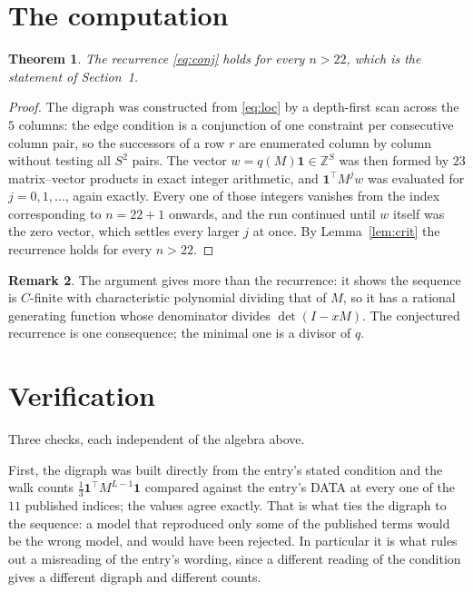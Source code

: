 \documentclass[11pt,a4paper]{article}
\theoremstyle{plain}
\newtheorem{theorem}{Theorem}
\theoremstyle{definition}
\newtheorem{remark}[theorem]{Remark}
\begin{document}
\section{The computation}

\begin{theorem}
The recurrence \eqref{eq:conj} holds for every $n>22$, which is the statement of
Section~1.
\end{theorem}

\begin{proof}
The digraph was constructed from \eqref{eq:loc} by a depth-first scan across the $5$
columns: the edge condition is a conjunction of one constraint per consecutive column
pair, so the successors of a row $r$ are enumerated column by column without testing all
$S^2$ pairs. The vector $w=q(M)\mathbf{1}\in\mathbb{Z}^{S}$ was then formed by $23$
matrix--vector products in exact integer arithmetic, and $\mathbf{1}^{\!\top}M^{j}w$ was
evaluated for $j=0,1,\dots$, again exactly. Every one of those integers vanishes from the
index corresponding to $n=22+1$ onwards, and the run continued until $w$ itself was the
zero vector, which settles every larger $j$ at once. By Lemma~\ref{lem:crit} the recurrence
holds for every $n>22$.
\end{proof}

\begin{remark}
The argument gives more than the recurrence: it shows the sequence is $C$-finite with
characteristic polynomial dividing that of $M$, so it has a rational generating function
whose denominator divides $\det(I-xM)$. The conjectured recurrence is one consequence; the
minimal one is a divisor of $q$.
\end{remark}

\section{Verification}

Three checks, each independent of the algebra above.

First, the digraph was built directly from the entry's stated condition and the walk counts
$\tfrac1{3}\mathbf{1}^{\!\top}M^{L-1}\mathbf{1}$ compared against the entry's DATA at
every one of the $11$ published indices; the values agree exactly. That is what ties
the digraph to the sequence: a model that reproduced only some of the published terms would
be the wrong model, and would have been rejected. In particular it is what rules out a
misreading of the entry's wording, since a different reading of the condition gives a
different digraph and different counts.
\end{document}
